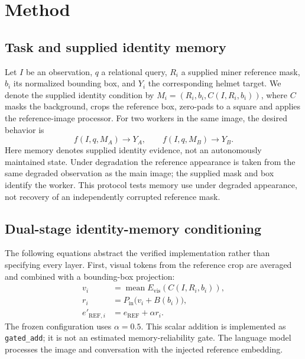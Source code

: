 \section{Method}
\label{sec:method}
\subsection{Task and supplied identity memory}
Let $I$ be an observation, $q$ a relational query, $R_i$ a supplied miner
reference mask, $b_i$ its normalized bounding box, and $Y_i$ the corresponding
helmet target. We denote the supplied identity condition by
$M_i=(R_i,b_i,C(I,R_i,b_i))$, where $C$ masks the background, crops the reference
box, zero-pads to a square and applies the reference-image processor.
For two workers in the same image, the desired behavior is
\begin{equation}
 f(I,q,M_A)\rightarrow Y_A,\qquad
 f(I,q,M_B)\rightarrow Y_B.
\end{equation}
Here memory denotes supplied identity evidence, not an autonomously maintained
state. Under degradation the reference appearance is taken from the same
degraded observation as the main image; the supplied mask and box identify the
worker. This protocol tests memory use under degraded appearance, not recovery
of an independently corrupted reference mask.

\subsection{Dual-stage identity-memory conditioning}
The following equations abstract the verified implementation rather than
specifying every layer. First, visual tokens from the reference crop are
averaged and combined with a bounding-box projection:
\begin{align}
 v_i &= \operatorname{mean} E_{\mathrm{vis}}(C(I,R_i,b_i)),\\
 r_i &= P_{\mathrm{in}}\bigl(v_i+B(b_i)\bigr),\\
 e'_{\mathrm{REF},i} &= e_{\mathrm{REF}}+\alpha r_i.
\end{align}
The frozen configuration uses $\alpha=0.5$. This scalar addition is implemented
as \texttt{gated\_add}; it is not an estimated memory-reliability gate. The
language model processes the image and conversation with the injected
reference embedding.

